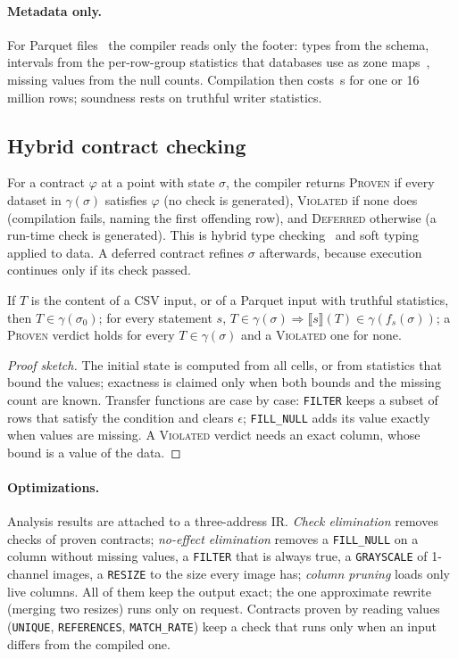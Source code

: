 \paragraph{Metadata only.} For Parquet files~\cite{parquet,melnik2010} the compiler reads only the
footer: types from the schema, intervals from the per-row-group statistics that databases use as
zone maps~\cite{moerkotte1998}, missing values from the null counts. Compilation then costs
\PqSixteen\,s for one or 16 million rows; soundness rests on truthful writer statistics.

\subsection{Hybrid contract checking}\label{sec:contracts}
For a contract $\varphi$ at a point with state $\sigma$, the compiler returns \textsc{Proven} if
every dataset in $\gamma(\sigma)$ satisfies $\varphi$ (no check is generated), \textsc{Violated} if
none does (compilation fails, naming the first offending row), and \textsc{Deferred} otherwise (a
run-time check is generated). This is hybrid type checking~\cite{flanagan2006} and soft
typing~\cite{cartwright1991} applied to data. A deferred contract refines $\sigma$ afterwards,
because execution continues only if its check passed.

\begin{lemma}\label{lem:sound}
If $T$ is the content of a CSV input, or of a Parquet input with truthful statistics, then
$T \in \gamma(\sigma_0)$; for every statement $s$, $T \in \gamma(\sigma) \Rightarrow
\llbracket s \rrbracket(T) \in \gamma(f_s(\sigma))$; a \textsc{Proven} verdict holds for every
$T \in \gamma(\sigma)$ and a \textsc{Violated} one for none.
\end{lemma}
\begin{proof}[Proof sketch]
The initial state is computed from all cells, or from statistics that bound the values; exactness is
claimed only when both bounds and the missing count are known. Transfer functions are case by case:
\texttt{FILTER} keeps a subset of rows that satisfy the condition and clears $\epsilon$;
\texttt{FILL\_NULL} adds its value exactly when values are missing. A \textsc{Violated} verdict needs
an exact column, whose bound is a value of the data.
\end{proof}

\paragraph{Optimizations.} Analysis results are attached to a three-address IR. \emph{Check
elimination} removes checks of proven contracts; \emph{no-effect elimination} removes a
\texttt{FILL\_NULL} on a column without missing values, a \texttt{FILTER} that is always true, a
\texttt{GRAYSCALE} of 1-channel images, a \texttt{RESIZE} to the size every image has;
\emph{column pruning} loads only live columns. All of them keep the output exact; the one
approximate rewrite (merging two resizes) runs only on request. Contracts proven by reading values
(\texttt{UNIQUE}, \texttt{REFERENCES}, \texttt{MATCH\_RATE}) keep a check that runs only when an
input differs from the compiled one.

